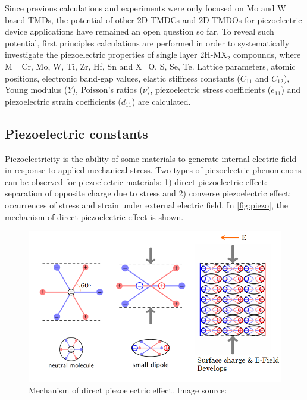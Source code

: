 Since previous calculations and experiments were only focused on Mo and W based TMDs, the potential of other 2D-TMDCs and 2D-TMDOs for piezoelectric device applications have remained an open question so far. To reveal such potential, first principles calculations are performed in order to systematically investigate the piezoelectric properties of single layer 2H-MX$_2$ compounds, where M= Cr,  Mo, W, Ti, Zr, Hf, Sn and X=O, S, Se, Te.  Lattice parameters, atomic positions, electronic band-gap values, elastic stiffness constants ($C_{11}$ and $C_{12}$), Young modulus ($Y$), Poisson's ratios ($\nu$), piezoelectric stress coefficients ($e_{11}$) and piezoelectric strain coefficients ($d_{11}$) are calculated. 

\subsection{Piezoelectric constants}

Piezoelectricity is the ability of some materials to generate internal electric field in response to applied mechanical stress. Two types of piezoelectric phenomenons can be observed for piezoelectric materials: 1) direct piezoelectric effect: separation of opposite charge due to stress and 2) converse piezoelectric effect: occurrences of stress and strain under external electric field. In \autoref{fig:piezo}, the mechanism of direct piezoelectric effect is shown. 

\begin{figure}[htbp]
\centering
\includegraphics[width=0.8\linewidth]{piezo.png}%
\caption{Mechanism of direct piezoelectric effect\label{fig:piezo}. Image source: \cite{piezo_fig}}
\end{figure}

